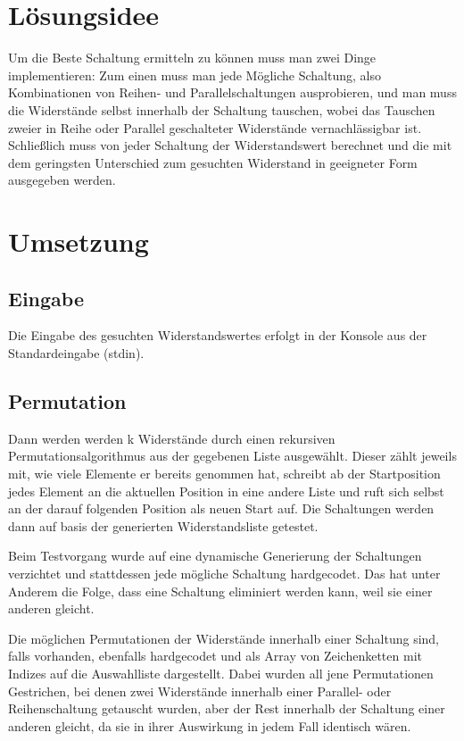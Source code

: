 \documentclass[a4paper,10pt,ngerman]{scrartcl}
\title{\Aufgabe}
\author{\Name\\Team-ID: \TeamId}
\date{\today}
\begin{document}
\maketitle
\vspace{7\baselineskip}
\tableofcontents
\pagebreak

\section{Lösungsidee}
\vspace{1\baselineskip}
Um die Beste Schaltung ermitteln zu können muss man zwei Dinge implementieren: Zum einen muss man jede Mögliche Schaltung, also Kombinationen von Reihen- und Parallelschaltungen ausprobieren, und man muss die Widerstände selbst innerhalb der Schaltung tauschen, wobei das Tauschen zweier in Reihe oder Parallel geschalteter Widerstände vernachlässigbar ist. Schließlich muss von jeder Schaltung der Widerstandswert berechnet und die mit dem geringsten Unterschied zum gesuchten Widerstand in geeigneter Form ausgegeben werden.


\pagebreak
\section{Umsetzung}
\subsection{Eingabe}
Die Eingabe des gesuchten Widerstandswertes erfolgt in der Konsole aus der Standardeingabe (stdin).

\subsection{Permutation}
Dann werden werden k Widerstände durch einen rekursiven Permutationsalgorithmus aus der gegebenen Liste ausgewählt. Dieser zählt jeweils mit, wie viele Elemente er bereits genommen hat, schreibt ab der Startposition jedes Element an die aktuellen Position in eine andere Liste und ruft sich selbst an der darauf folgenden Position als neuen Start auf. Die Schaltungen werden dann auf basis der generierten Widerstandsliste getestet.

Beim Testvorgang wurde auf eine dynamische Generierung der Schaltungen verzichtet und stattdessen jede mögliche Schaltung hardgecodet. Das hat unter Anderem die Folge, dass eine Schaltung eliminiert werden kann, weil sie einer anderen gleicht.

Die möglichen Permutationen der Widerstände innerhalb einer Schaltung sind, falls vorhanden, ebenfalls hardgecodet und als Array von Zeichenketten mit Indizes auf die Auswahlliste dargestellt. Dabei wurden all jene Permutationen Gestrichen, bei denen zwei Widerstände innerhalb einer Parallel- oder Reihenschaltung getauscht wurden, aber der Rest innerhalb der Schaltung einer anderen gleicht, da sie in ihrer Auswirkung in jedem Fall identisch wären.
\end{document}
